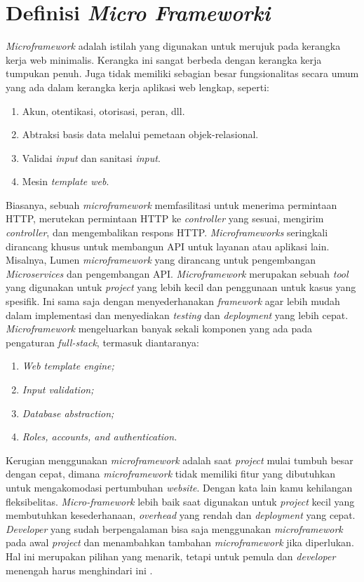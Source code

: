 ﻿\section{Definisi \textit{Micro Frameworki}}

\textit{Microframework} adalah istilah yang digunakan untuk merujuk pada kerangka kerja web minimalis. Kerangka ini sangat berbeda dengan kerangka kerja tumpukan penuh. Juga tidak memiliki sebagian besar fungsionalitas secara umum yang ada dalam kerangka kerja aplikasi web lengkap, seperti:
\begin{enumerate}
\item Akun, otentikasi, otorisasi, peran, dll.
\item Abtraksi basis data melalui pemetaan objek-relasional.
\item Validai  \textit{input} dan sanitasi \textit{input}.
\item Mesin \textit{template web}.
\end{enumerate}

Biasanya, sebuah \textit{microframework} memfasilitasi untuk menerima permintaan HTTP, merutekan permintaan HTTP ke \textit{controller} yang sesuai, mengirim \textit{controller}, dan mengembalikan respons HTTP. \textit{Microframeworks} seringkali dirancang khusus untuk membangun API untuk layanan atau aplikasi lain. Misalnya, Lumen \textit{microframework} yang dirancang untuk pengembangan \textit{Microservices} dan pengembangan API. \textit{Microframework} merupakan sebuah \textit{tool} yang digunakan untuk \textit{project} yang lebih kecil dan penggunaan untuk kasus yang spesifik. Ini sama saja dengan menyederhanakan \textit{framework} agar lebih mudah dalam implementasi dan menyediakan \textit{testing} dan \textit{deployment} yang lebih cepat. \textit{Microframework} mengeluarkan banyak sekali komponen yang ada pada pengaturan \textit{full-stack}, termasuk diantaranya:
\begin{enumerate}
\item \textit{Web template engine;}
\item \textit{Input validation;}
\item \textit{Database abstraction;}
\item \textit{Roles, accounts, and authentication.}
\end{enumerate}

Kerugian menggunakan  \textit{microframework} adalah saat  \textit{project} mulai tumbuh besar dengan cepat, dimana  \textit{microframework} tidak memiliki fitur yang dibutuhkan untuk mengakomodasi pertumbuhan  \textit{website}. Dengan kata lain kamu kehilangan fleksibelitas.  \textit{Micro-framework} lebih baik saat digunakan untuk  \textit{project} kecil yang membutuhkan kesederhanaan,  \textit{overhead} yang rendah dan  \textit{deployment} yang cepat.  \textit{Developer} yang sudah berpengalaman bisa saja menggunakan  \textit{microframework} pada awal  \textit{project} dan menambahkan tambahan  \textit{microframework} jika diperlukan. Hal ini merupakan pilihan yang menarik, tetapi untuk pemula dan  \textit{developer} menengah harus menghindari ini \cite{fadhilnet}.

